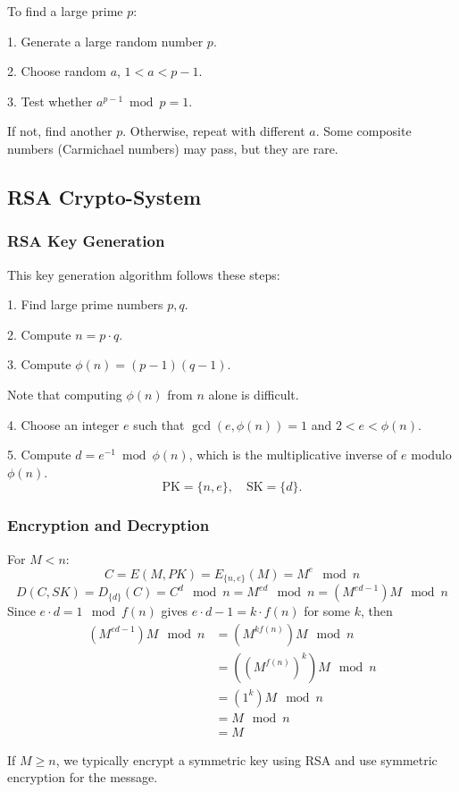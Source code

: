 To find a large prime \(p\):

1. Generate a large random number \(p\).

2. Choose random \(a\), \(1 < a < p - 1\).

3. Test whether \(a^{p-1} \bmod p = 1\).

If not, find another \(p\). Otherwise, repeat with different \(a\). Some composite numbers (Carmichael numbers) may pass, but they are rare.

\subsection{RSA Crypto-System}
\subsubsection{RSA Key Generation}
This key generation algorithm follows these steps:

1. Find large prime numbers \(p, q\).

2. Compute \(n = p \cdot q\).

3. Compute \(\phi(n) = (p - 1)(q - 1)\).

Note that computing \(\phi(n)\) from \(n\) alone is difficult.

4. Choose an integer \(e\) such that \(\gcd(e, \phi(n)) = 1\) and \(2 < e < \phi(n)\).

5. Compute \(d = e^{-1} \bmod \phi(n)\), which is the multiplicative inverse of \(e\) modulo \(\phi(n)\).
\[
  \text{PK} = \{n, e\}, \quad \text{SK} = \{d\}.
\]

\subsubsection{Encryption and Decryption}
For \(M < n\):
\[
  C = E(M, PK) = E_{\{n, e\}} (M) = M^e \mod n
\]
\[
  D(C, SK) = D_{\{d\}} (C) = C^d \mod n = M^{ed} \mod n = (M^{ed-1})M \mod n
\]
Since \(e \cdot d = 1 \mod f(n)\) gives \(e \cdot d - 1 = k \cdot f(n)\) for some \(k\), then 
\[
  \begin{aligned}
    (M^{ed-1})M \mod n &= (M^{kf(n)})M \mod n\\
    &= ((M^{f(n)})^k)M \mod n \\
    &= (1^k)M \mod n \\
    &= M \mod n \\
    &= M
  \end{aligned}
\]

\begin{remark}
If \(M \geq n\), we typically encrypt a symmetric key using RSA and use symmetric encryption for the message.
\end{remark}

